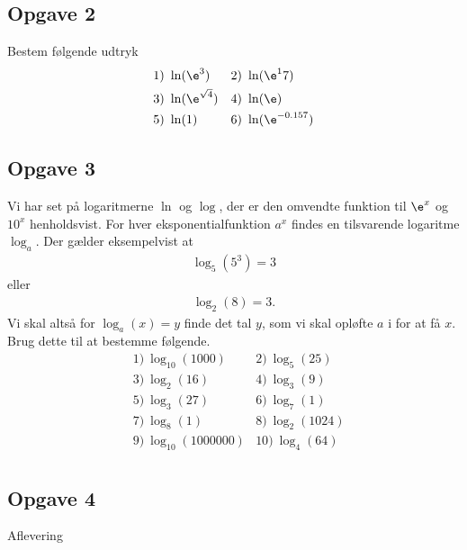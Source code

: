 \subsection*{Opgave 2}
Bestem følgende udtryk 
\begin{align*}
	&1) \ \ln(\e^3)    &&2) \ \ln(\e^17)   \\  
	&3) \ \ln(\e^{\sqrt{4}})   &&4) \ \ln(\e)     \\  
	&5) \ \ln(1)   &&6) \ \ln(\e^{-0.157})   \\  
\end{align*}


\subsection*{Opgave 3}
Vi har set på logaritmerne $\ln$ og $\log$, der er den omvendte funktion til $\e^x$ og $10^x$ henholdsvist. For hver eksponentialfunktion $a^x$ findes en tilsvarende logaritme
$\log_a$. Der gælder eksempelvist at
\begin{align*}
	\log_5(5^3) = 3
\end{align*}
eller 
\begin{align*}
	\log_2(8) = 3.
\end{align*}
Vi skal altså for $\log_a(x) = y$ finde det tal $y$, som vi skal opløfte $a$ i for at få $x$.  \\

Brug dette til at bestemme følgende.
\begin{align*}
	&1) \  \log_{10}(1000)      &2) \  \log_5(25)       \\
	&3) \  \log_2(16)       &4) \ \log_3(9)         \\
	&5) \  \log_3(27)      &6) \  \log_7(1)      \\
	&7) \  \log_8(1)      &8) \  \log_2(1024)      \\
	&9) \  \log_{10}(1000000)     &10) \  \log_4(64)        \\
\end{align*}


\subsection*{Opgave 4}

Aflevering